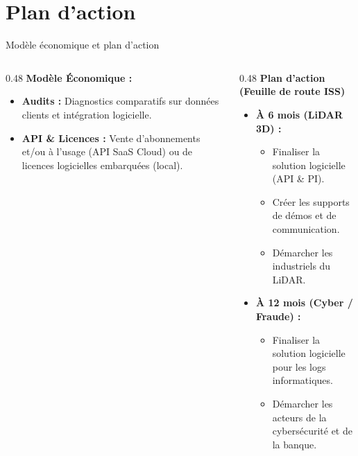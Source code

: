 \documentclass[A4,svgnames,9pt,aspectratio=169]{beamer}
\begin{document}
\section{Plan d'action}
\begin{frame}{Modèle économique et plan d'action}
    \begin{columns}[T]
        \begin{column}{0.48\textwidth}
            \textbf{\bleu Modèle Économique :}
            \begin{itemize}
                \item \textbf{Audits :} Diagnostics comparatifs sur données clients et intégration logicielle.
                \item \textbf{API \& Licences :} Vente d'abonnements et/ou à l'usage (API SaaS Cloud) ou de licences logicielles embarquées (local).
            \end{itemize}
        \end{column}
        
        \begin{column}{0.48\textwidth}
            \textbf{\bleu Plan d'action (Feuille de route ISS)}
            \begin{itemize}
                \item \textbf{À 6 mois (LiDAR 3D) :}
                \begin{itemize}
                    \item Finaliser la solution logicielle (API \& PI).
                    \item Créer les supports de démos et de communication.
                    \item Démarcher les industriels du LiDAR.
                \end{itemize}
                \item \textbf{À 12 mois (Cyber / Fraude) :}
                \begin{itemize}
                    \item Finaliser la solution logicielle pour les logs informatiques.
                    \item Démarcher les acteurs de la cybersécurité et de la banque.
                \end{itemize}
            \end{itemize}
        \end{column}
    \end{columns}
\end{frame}
\end{document}
